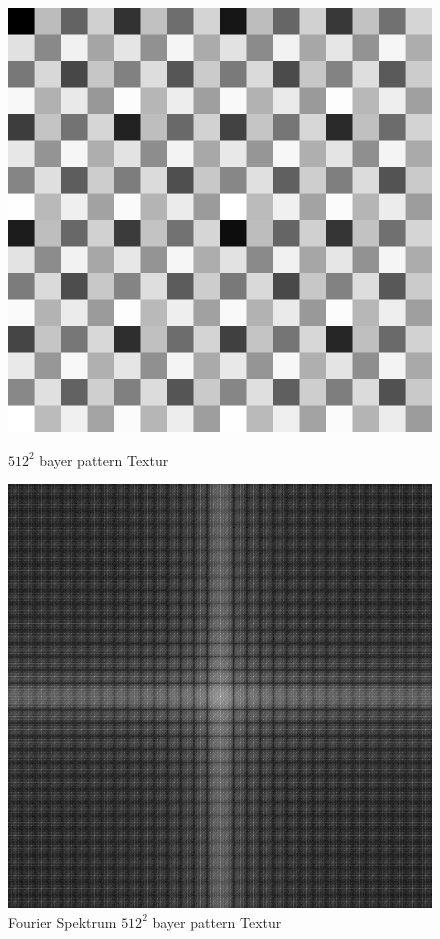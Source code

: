 \begin{figure}[H]\label{pic:bayerPatternFFT}
    \centering
    \begin{minipage}[t]{0.45\linewidth}
        \centering
        \includegraphics[width=\linewidth]{content/BlueNoise/Bilder/BayerMatrix.png}
        \caption{$512^{2}$ bayer pattern Textur}
    \end{minipage}
    \hfill
    \begin{minipage}[t]{0.45\linewidth}
        \centering
        \includegraphics[width=\linewidth]{content/BlueNoise/Bilder/FFT_BayerMatrix.png}
        \caption{Fourier Spektrum $512^{2}$ bayer pattern Textur}
    \end{minipage}
\end{figure}

